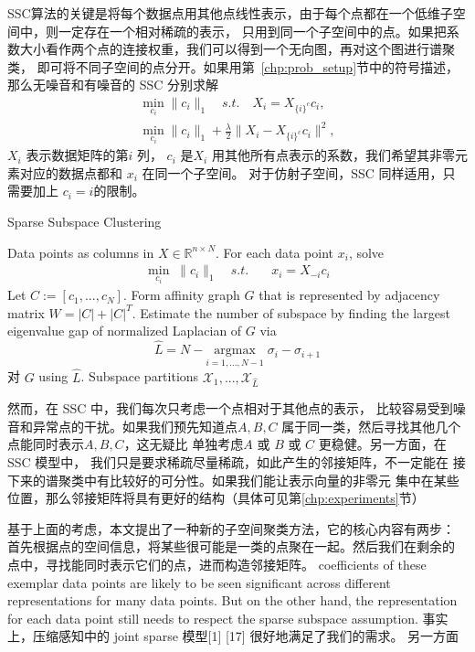\documentclass[main]{subfiles}
\begin{document}
SSC算法的关键是将每个数据点用其他点线性表示，由于每个点都在一个低维子空间中，则一定存在一个相对稀疏的表示，
只用到同一个子空间中的点。如果把系数大小看作两个点的连接权重，我们可以得到一个无向图，再对这个图进行谱聚类，
即可将不同子空间的点分开。如果用第~\ref{chp:prob_setup}节中的符号描述，那么无噪音和有噪音的 SSC 分别求解
\begin{align*}
  \min_{c_i} \|c_i\|_1\quad s.t.\quad X_i=X_{\{i\}^c}c_i, \\
  \min_{c_i} \|c_i\|_1+\frac{\lambda}{2}\|X_i-X_{\{i\}^c}c_i\|^2,
\end{align*}
$X_i$ 表示数据矩阵的第$i$ 列， $c_i$ 是$X_i$ 用其他所有点表示的系数，我们希望其非零元素对应的数据点都和 $x_i$ 在同一个子空间。
对于仿射子空间，SSC 同样适用，只需要加上 $c_i = i$的限制。

\begin{algorithm}[tb]
  \caption{Sparse Subspace Clustering}
  \label{alg:SSC}
  \begin{algorithmic}
    Data points as columns in $X\in \mathbb{R}^{n\times N}$.
     For each data point $x_i$, solve
    \begin{align}\label{eq:SSC}
      \min_{c_i} \; \|c_i\|_1 \quad s.t. \quad &x_i=X_{-i}c_i
    \end{align}
     Let $C:=[c_1,...,c_N]$. Form affinity graph $G$ that is represented by adjacency matrix $W=|C|+|C|^T$.
     Estimate the number of subspace by finding the largest eigenvalue gap of normalized Laplacian of $G$ via
    $$\hat{L}=N-\underset{i=1,...,N-1}{\text{argmax}}\; \sigma_i-\sigma_{i+1}$$
     对 $G$ using $\hat{L}$.
     Subspace partitions $\mathcal{X}_1,...,\mathcal{X}_{\hat{L}}$
  \end{algorithmic}
\end{algorithm}

然而，在 SSC 中，我们每次只考虑一个点相对于其他点的表示，
比较容易受到噪音和异常点的干扰。如果我们预先知道点$A,B,C$
属于同一类，然后寻找其他几个点能同时表示$A,B,C$，这无疑比
单独考虑$A$ 或 $B$ 或 $C$ 更稳健。另一方面，在SSC 模型中，
我们只是要求稀疏尽量稀疏，如此产生的邻接矩阵，不一定能在
接下来的谱聚类中有比较好的可分性。如果我们能让表示向量的非零元
集中在某些位置，那么邻接矩阵将具有更好的结构（具体可见第\ref{chp:experiments}节）

基于上面的考虑，本文提出了一种新的子空间聚类方法，它的核心内容有两步：
首先根据点的空间信息，将某些很可能是一类的点聚在一起。然后我们在剩余的
点中，寻找能同时表示它们的点，进而构造邻接矩阵。
coefficients of these exemplar data points are likely to be
seen significant across different representations for many
data points. But on the other hand, the representation for
each data point still needs to respect the sparse subspace
assumption. 事实上，压缩感知中的 joint sparse 模型[1]  [17] 很好地满足了我们的需求。
另一方面
\end{document}
